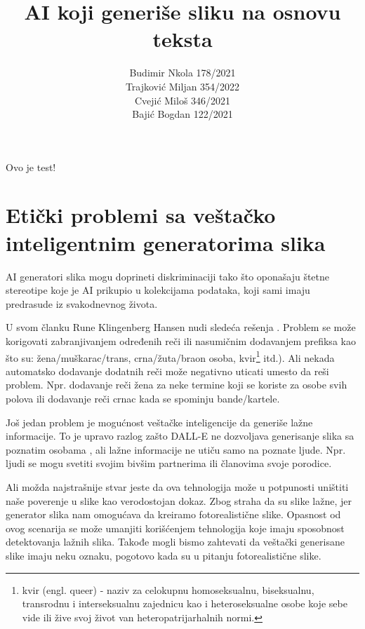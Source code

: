 \documentclass[12pt, letterpaper]{article}
\title{AI koji generiše sliku na osnovu teksta}
\author{Budimir Nkola 178/2021\\Trajković Miljan 354/2022\\Cvejić Miloš 346/2021\\Bajić Bogdan 122/2021}
\begin{document}
\maketitle
Ovo je test!

\begin{abstract}
\end{abstract}

\begin{tableofcontents}
\end{tableofcontents}

\pagebreak
\section{Etički problemi sa veštačko inteligentnim generatorima slika}

AI generatori slika mogu doprineti diskriminaciji tako što oponašaju štetne stereotipe koje je AI prikupio u kolekcijama podataka, koji sami imaju predrasude iz svakodnevnog života.

U svom članku Rune Klingenberg Hansen nudi sledeća rešenja \cite{kljuc1}. Problem se može korigovati zabranjivanjem određenih reči ili nasumičnim dodavanjem prefiksa kao što su: žena/muškarac/trans, crna/žuta/braon osoba, kvir\footnote{kvir (engl. queer) - naziv za celokupnu homoseksualnu, biseksualnu, transrodnu i interseksualnu zajednicu kao i heteroseksualne osobe koje sebe vide ili žive svoj život van heteropatrijarhalnih normi.} itd.). Ali nekada automatsko dodavanje dodatnih reči može negativno uticati umesto da reši problem. Npr. dodavanje reči žena za neke termine koji se koriste za osobe svih polova ili dodavanje reči crnac kada se spominju bande/kartele.

Još jedan problem je mogućnost veštačke inteligencije da generiše lažne informacije. To je upravo razlog zašto DALL-E \cite{dalle} ne dozvoljava generisanje slika sa poznatim osobama \cite{poznate}, ali lažne informacije ne utiču samo na poznate ljude. Npr. ljudi se mogu svetiti svojim bivšim partnerima ili članovima svoje porodice.

Ali možda najstrašnije stvar jeste da ova tehnologija može u potpunosti uništiti naše poverenje u slike kao verodostojan dokaz. Zbog straha da su slike lažne, jer generator slika nam omogućava da kreiramo fotorealistične slike. Opasnost od ovog scenarija se može umanjiti korišćenjem tehnologija koje imaju sposobnost detektovanja lažnih slika. Takođe mogli bismo zahtevati da veštački generisane slike imaju neku oznaku, pogotovo kada su u pitanju fotorealistične slike.
\end{document}
